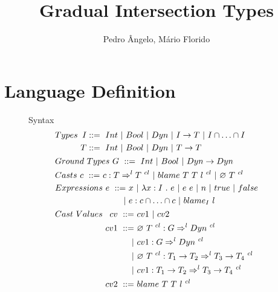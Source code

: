 \documentclass[a4paper]{article}
\begin{document}
\title{Gradual Intersection Types}

\author{Pedro Ângelo, Mário Florido}

\maketitle
{}

\section{Language Definition}
\begin{figure}[H]
Syntax
\begin{align*}
&Types\ \begin{aligned}[t] I &::=\ \Int\ |\ \Bool\ |\ \Dyn\ |\ I \rightarrow T\ |\ I \cap \ldots \cap I\\
                          T &::=\ \Int\ |\ \Bool\ |\ \Dyn\ |\ T \rightarrow T \end{aligned}\\
&Ground\ Types\ G\ ::=\ \Int\ |\ \Bool\ |\ \Dyn \rightarrow \Dyn\\
&Casts\ \begin{aligned}[t] c\ ::=&\ c : T \Rightarrow^l T\ ^{cl}\ |\ \blamecast{T}{T}{l}{cl}\ |\ \emptycast{T}{cl} \end{aligned}\\
&Expressions\ \begin{aligned}[t] e\ ::=&\ x\ |\ \lambda x : I\ .\ e\ |\ e\ e\ |\ n\ |\ \true\ |\ \false\\
                                      |&\ e : c \cap \ldots \cap c\ |\ \blame{I}{l} \end{aligned}\\
&Cast\ Values\ \begin{aligned}[t] cv\ ::=&\ cv1\ |\ cv2\\
                                cv1\ ::=&\ \emptycast{T}{cl} : G \Rightarrow^l \Dyn\ ^{cl}\\
                                       |&\ cv1 : G \Rightarrow^l \Dyn\ ^{cl}\\
                                       |&\ \emptycast{T}{cl} : T_1 \rightarrow T_2 \Rightarrow^l T_3 \rightarrow T_4\ ^{cl}\\
                                       |&\ cv1 : T_1 \rightarrow T_2 \Rightarrow^l T_3 \rightarrow T_4\ ^{cl}\\
                                cv2\ ::=&\ \blamecast{T}{T}{l}{cl}\\

\end{aligned}
\end{align*}
\end{figure}
\end{document}
